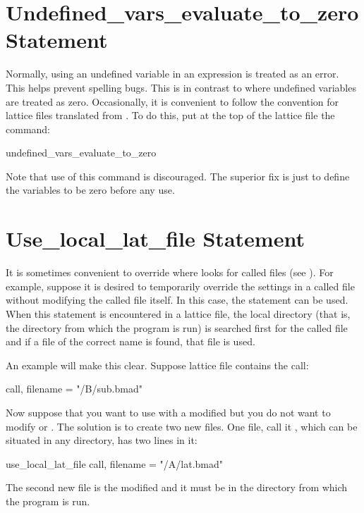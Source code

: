{{{{{%
\section{Undefined_vars_evaluate_to_zero Statement}

Normally, using an undefined variable in an expression is treated as an error. This helps
prevent spelling bugs. This is in contrast to \mad where undefined variables are treated
as zero. Occasionally, it is convenient to follow the \mad convention for lattice files
translated from \mad. To do this, put at the top of the lattice file the command:
\begin{example}
  undefined_vars_evaluate_to_zero 
\end{example}
Note that use of this command is discouraged. The superior fix is just to define the variables
to be zero before any use.

\section{Use_local_lat_file Statement}
\label{s:use.loc}

It is sometimes convenient to override where \bmad looks for called files (see ). For
example, suppose it is desired to temporarily override the settings in a called file without
modifying the called file itself. In this case, the  statement can be
used. When this statement is encountered in a lattice file, the local directory (that is, the
directory from which the program is run) is searched first for the called file and if a file of the
correct name is found, that file is used.

An example will make this clear. Suppose lattice file 
contains the call:
\begin{example}
  call, filename = "/B/sub.bmad"
\end{example}
Now suppose that you want to use  with a modified  but you do not want to
modify  or . The solution is to create two new files. One file, call
it , which can be situated in any directory, has two lines in it:
\begin{example}
  use_local_lat_file
  call, filename = "/A/lat.bmad"
\end{example}
The second new file is the modified  and it must be in the directory from which the
program is run.

}}}}}

